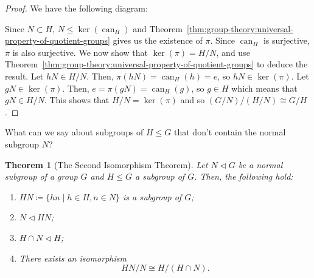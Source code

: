 \documentclass[12pt]{report}
\newcommand{\iso}{\cong}
\newcommand{\can}{\operatorname{can}}
\newtheorem{theorem}{Theorem}[section] %
\theoremstyle{definition}
\begin{document}
\begin{proof}
  We have the following diagram:
  \begin{center}
  \end{center}

  Since \(N \subset H\), \(N \leq \ker(\can_{H})\) and Theorem~\ref{thm:group-theory:universal-property-of-quotient-groups} gives us the existence of \(\pi\).
  Since \(\can_{H}\) is surjective, \(\pi\) is also surjective.
  We now show that \(\ker(\pi) = H/N\), and use Theorem~\ref{thm:group-theory:universal-property-of-quotient-groups} to deduce the result.
  Let \(hN \in H/N\).
  Then, \(\pi(hN) = \can_{H}(h) = e\), so \(hN \in \ker(\pi)\).
  Let \(gN \in \ker(\pi)\).
  Then, \(e = \pi(gN) = \can_{H}(g)\), so \(g \in H\) which means that \(gN \in H/N\).
  This shows that \(H/N = \ker(\pi)\) and so \((G/N) / (H/N) \iso G/H\).
\end{proof}

What can we say about subgroups of \(H \leq G\) that don't contain the normal subgroup \(N\)?

\begin{theorem}[The Second Isomorphism Theorem]
 \label{thm:group-theory:second-isomorphism-theorem}
 Let \(N \triangleleft G\) be a normal subgroup of a group \(G\) and  \(H \leq G\) a subgroup of \(G\).
 Then, the following hold:
 \begin{enumerate}
 \item
   \(HN \coloneqq \{hn \mid h \in H, n \in N\}\) is a subgroup of \(G\);
 \item
   \(N \triangleleft HN\);
 \item
   \(H \cap N \triangleleft H\);
 \item
   There exists an isomorphism
   \[HN/N \iso H/(H\cap N).\]
 \end{enumerate}
\end{theorem}
\end{document}
